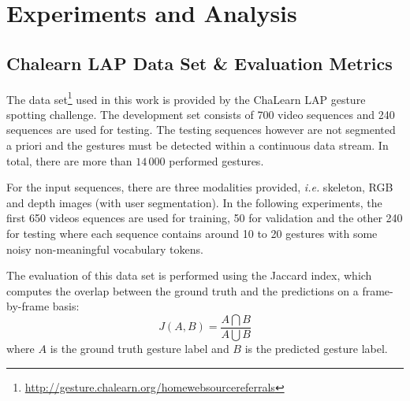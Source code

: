 

\section{Experiments and Analysis}





\subsection{Chalearn LAP Data Set \& Evaluation Metrics} \label{sec:chalearn}
The data set\footnote{\href{http://gesture.chalearn.org/homewebsourcereferrals}{http://gesture.chalearn.org/homewebsourcereferrals}} used in this work is provided by the ChaLearn LAP \cite{chalearnLAP} gesture spotting challenge. The development set consists of 700 video sequences and 240 sequences are used for testing. The testing sequences however are not segmented a priori and the gestures must be detected within a continuous data stream. In total, there are more than $14\,000$ performed gestures.

For the input sequences, there are three modalities provided, \emph{i.e.} skeleton, RGB and depth images (with user segmentation). In the following experiments, the first 650 videos equences are used for training, 50 for validation and the other 240 for testing where each sequence contains around 10 to 20 gestures with some noisy non-meaningful vocabulary tokens.

The evaluation of this data set is performed using the Jaccard index, which computes the overlap between the ground truth and the predictions on a frame-by-frame basis:
\begin{equation}
J(A, B) = \frac{A \bigcap B}{A \bigcup B}
\end{equation}
where $A$ is the ground truth gesture label and $B$ is the predicted gesture label.


